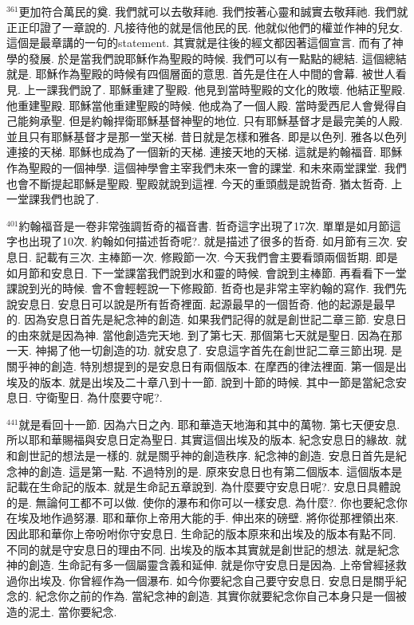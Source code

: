 \documentclass{book}
\begin{document}
$^{361}$更加符合萬民的奠.
我們就可以去敬拜祂.
我們按著心靈和誠實去敬拜祂.
我們就正正印證了一章說的.
凡接待他的就是信他民的民.
他就似他們的權並作神的兒女.
這個是最章講的一句的statement.
其實就是往後的經文都因著這個宣言.
而有了神學的發展.
於是當我們說耶穌作為聖殿的時候.
我們可以有一點點的總結.
這個總結就是.
耶穌作為聖殿的時候有四個層面的意思.
首先是住在人中間的會幕.
被世人看見.
上一課我們說了.
耶穌重建了聖殿.
他見到當時聖殿的文化的敗壞.
他結正聖殿.
他重建聖殿.
耶穌當他重建聖殿的時候.
他成為了一個人殿.
當時愛西尼人會覺得自己能夠承聖.
但是約翰捍衛耶穌基督神聖的地位.
只有耶穌基督才是最完美的人殿.
並且只有耶穌基督才是那一堂天梯.
昔日就是怎樣和雅各.
即是以色列.
雅各以色列連接的天梯.
耶穌也成為了一個新的天梯.
連接天地的天梯.
這就是約翰福音.
耶穌作為聖殿的一個神學.
這個神學會主宰我們未來一會的課堂.
和未來兩堂課堂.
我們也會不斷提起耶穌是聖殿.
聖殿就說到這裡.
今天的重頭戲是說哲奇.
猶太哲奇.
上一堂課我們也說了.

$^{401}$約翰福音是一卷非常強調哲奇的福音書.
哲奇這字出現了17次.
單單是如月節這字也出現了10次.
約翰如何描述哲奇呢?.
就是描述了很多的哲奇.
如月節有三次.
安息日.
記載有三次.
主棒節一次.
修殿節一次.
今天我們會主要看頭兩個哲期.
即是如月節和安息日.
下一堂課當我們說到水和靈的時候.
會說到主棒節.
再看看下一堂課說到光的時候.
會不會輕輕說一下修殿節.
哲奇也是非常主宰約翰的寫作.
我們先說安息日.
安息日可以說是所有哲奇裡面.
起源最早的一個哲奇.
他的起源是最早的.
因為安息日首先是紀念神的創造.
如果我們記得的就是創世記二章三節.
安息日的由來就是因為神.
當他創造完天地.
到了第七天.
那個第七天就是聖日.
因為在那一天.
神揭了他一切創造的功.
就安息了.
安息這字首先在創世記二章三節出現.
是關乎神的創造.
特別想提到的是安息日有兩個版本.
在摩西的律法裡面.
第一個是出埃及的版本.
就是出埃及二十章八到十一節.
說到十節的時候.
其中一節是當紀念安息日.
守衛聖日.
為什麼要守呢?.

$^{441}$就是看回十一節.
因為六日之內.
耶和華造天地海和其中的萬物.
第七天便安息.
所以耶和華賜福與安息日定為聖日.
其實這個出埃及的版本.
紀念安息日的緣故.
就和創世記的想法是一樣的.
就是關乎神的創造秩序.
紀念神的創造.
安息日首先是紀念神的創造.
這是第一點.
不過特別的是.
原來安息日也有第二個版本.
這個版本是記載在生命記的版本.
就是生命記五章說到.
為什麼要守安息日呢?.
安息日具體說的是.
無論何工都不可以做.
使你的瀑布和你可以一樣安息.
為什麼?.
你也要紀念你在埃及地作過努瀑.
耶和華你上帝用大能的手.
伸出來的磅壁.
將你從那裡領出來.
因此耶和華你上帝吩咐你守安息日.
生命記的版本原來和出埃及的版本有點不同.
不同的就是守安息日的理由不同.
出埃及的版本其實就是創世記的想法.
就是紀念神的創造.
生命記有多一個屬靈含義和延伸.
就是你守安息日是因為.
上帝曾經拯救過你出埃及.
你曾經作為一個瀑布.
如今你要紀念自己要守安息日.
安息日是關乎紀念的.
紀念你之前的作為.
當紀念神的創造.
其實你就要紀念你自己本身只是一個被造的泥土.
當你要紀念.
\end{document}
